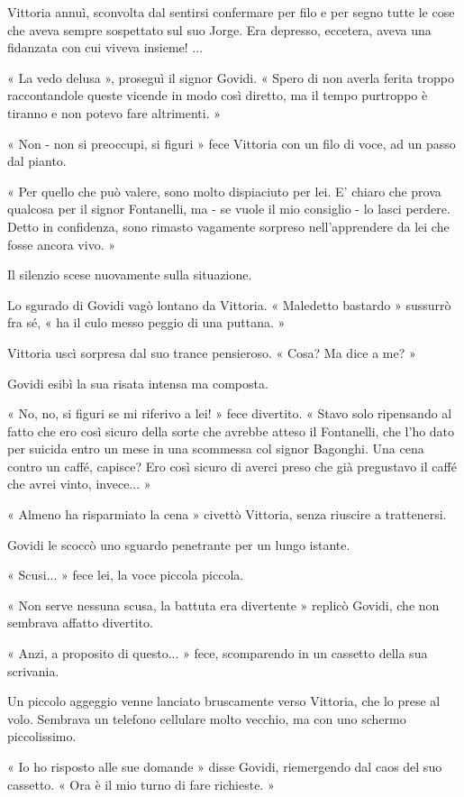 Vittoria annuì, sconvolta dal sentirsi confermare per filo e per segno tutte le cose che aveva sempre sospettato sul suo Jorge. Era depresso, eccetera, aveva una fidanzata con cui viveva insieme! ...

« La vedo delusa », proseguì il signor Govidi. « Spero di non averla ferita troppo raccontandole queste vicende in modo così diretto, ma il tempo purtroppo è tiranno e non potevo fare altrimenti. »

« Non - non si preoccupi, si figuri » fece Vittoria con un filo di voce, ad un passo dal pianto.

« Per quello che può valere, sono molto dispiaciuto per lei. E' chiaro che prova qualcosa per il signor Fontanelli, ma - se vuole il mio consiglio - lo lasci perdere. Detto in confidenza, sono rimasto vagamente sorpreso nell'apprendere da lei che fosse ancora vivo. »

Il silenzio scese nuovamente sulla situazione.

Lo sgurado di Govidi vagò lontano da Vittoria. « Maledetto bastardo » sussurrò fra sé, « ha il culo messo peggio di una puttana. » 

Vittoria uscì sorpresa dal suo trance pensieroso. « Cosa? Ma dice a me?  »

Govidi esibì la sua risata intensa ma composta. 

« No, no, si figuri se mi riferivo a lei! » fece divertito.  « Stavo solo ripensando al fatto che ero così sicuro della sorte che avrebbe atteso il Fontanelli, che l'ho dato per suicida entro un mese in una scommessa col signor Bagonghi. Una cena contro un caffé, capisce? Ero così sicuro di averci preso che già pregustavo il caffé che avrei vinto, invece... »

« Almeno ha risparmiato la cena » civettò Vittoria, senza riuscire a trattenersi.

Govidi le scoccò uno sguardo penetrante per un lungo istante. 

« Scusi... » fece lei, la voce piccola piccola.

« Non serve nessuna scusa, la battuta era divertente » replicò Govidi, che non sembrava affatto divertito.

« Anzi, a proposito di questo... » fece, scomparendo in un cassetto della sua scrivania.

Un piccolo aggeggio venne lanciato bruscamente verso Vittoria, che lo prese al volo. Sembrava un telefono cellulare molto vecchio, ma con uno schermo piccolissimo.

« Io ho risposto alle sue domande » disse Govidi, riemergendo dal caos del suo cassetto. « Ora è il mio turno di fare richieste. »

